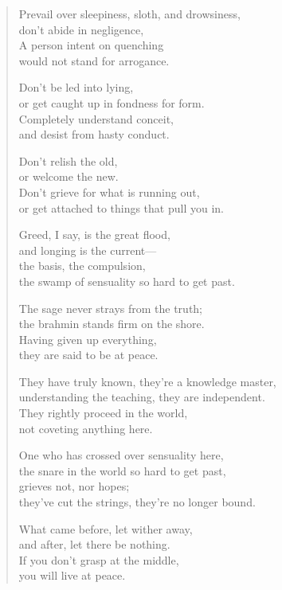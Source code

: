 \documentclass[12pt,openany]{book}%
\begin{document}
\begin{verse}
Prevail over sleepiness, sloth, and drowsiness, \\
don’t abide in negligence, \\
A person intent on quenching \\
would not stand for arrogance. 

Don’t be led into lying, \\
or get caught up in fondness for form. \\
Completely understand conceit, \\
and desist from hasty conduct. 

Don’t relish the old, \\
or welcome the new. \\
Don’t grieve for what is running out, \\
or get attached to things that pull you in. 

Greed, I say, is the great flood, \\
and longing is the current—\\
the basis, the compulsion, \\
the swamp of sensuality so hard to get past. 

The sage never strays from the truth; \\
the brahmin stands firm on the shore. \\
Having given up everything, \\
they are said to be at peace. 

They have truly known, they’re a knowledge master, \\
understanding the teaching, they are independent. \\
They rightly proceed in the world, \\
not coveting anything here. 

One who has crossed over sensuality here, \\
the snare in the world so hard to get past, \\
grieves not, nor hopes; \\
they’ve cut the strings, they’re no longer bound. 

What came before, let wither away, \\
and after, let there be nothing. \\
If you don’t grasp at the middle, \\
you will live at peace. 


\end{verse}
\end{document}
